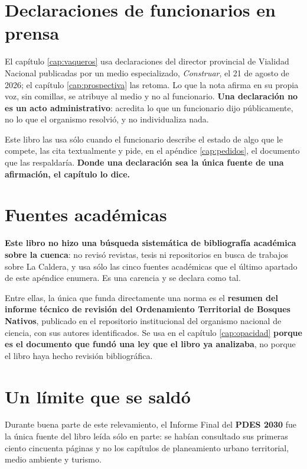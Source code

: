 \section{Declaraciones de funcionarios en prensa}

El capítulo \ref{cap:vaqueros} usa declaraciones del director provincial de Vialidad Nacional publicadas por un medio especializado, \textit{Construar}, el 21 de agosto de 2026; el capítulo \ref{cap:prospectiva} las retoma. Lo que la nota afirma en su propia voz, sin comillas, se atribuye al medio y no al funcionario. \textbf{Una declaración no es un acto administrativo}: acredita lo que un funcionario dijo públicamente, no lo que el organismo resolvió, y no individualiza nada.

Este libro las usa sólo cuando el funcionario describe el estado de algo que le compete, las cita textualmente y pide, en el apéndice \ref{cap:pedidos}, el documento que las respaldaría. \textbf{Donde una declaración sea la única fuente de una afirmación, el capítulo lo dice.}

\section{Fuentes académicas}

\textbf{Este libro no hizo una búsqueda sistemática de bibliografía académica sobre la cuenca}: no revisó revistas, tesis ni repositorios en busca de trabajos sobre La Caldera, y usa sólo las cinco fuentes académicas que el último apartado de este apéndice enumera. Es una carencia y se declara como tal.

Entre ellas, la única que funda directamente una norma es el \textbf{resumen del informe técnico de revisión del Ordenamiento Territorial de Bosques Nativos}, publicado en el repositorio institucional del organismo nacional de ciencia, con sus autores identificados. Se usa en el capítulo \ref{cap:opacidad} \textbf{porque es el documento que fundó una ley que el libro ya analizaba}, no porque el libro haya hecho revisión bibliográfica.

\section{Un límite que se saldó}

Durante buena parte de este relevamiento, el Informe Final del \textbf{PDES 2030} fue la única fuente del libro leída sólo en parte: se habían consultado sus primeras ciento cincuenta páginas y no los capítulos de planeamiento urbano territorial, medio ambiente y turismo.

